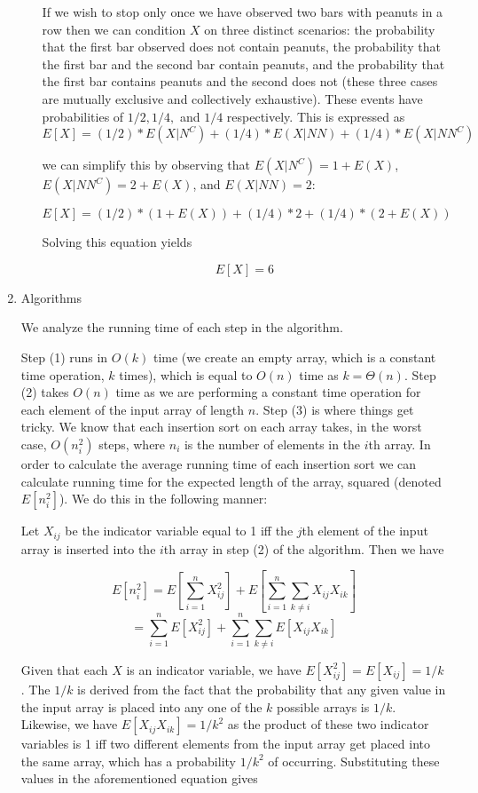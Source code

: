 \documentclass[submit]{harvardml}
\begin{document}
\begin{enumerate}
\begin{enumerate}
      If we wish to stop only once we have observed two bars with peanuts in a row then we can
      condition $X$ on three distinct scenarios: the probability that the first bar observed does
      not contain peanuts, the probability that the first bar and the second bar contain peanuts,
      and the probability that the first bar contains peanuts and the second does not (these three
      cases are mutually exclusive and collectively exhaustive). These events have probabilities of
      $1/2, 1/4, $ and $1/4$ respectively. This is expressed as
      $$E[X] = (1/2) * E(X|N^C) + (1/4) * E(X|NN) + (1/4) * E(X|NN^C)$$

      we can simplify this by observing that $E(X|N^C) = 1 + E(X)$, $E(X|NN^C) = 2 + E(X)$, and
      $E(X|NN) = 2$:

      $$E[X] = (1/2) * (1 + E(X)) + (1/4) * 2 + (1/4) * (2 + E(X))$$

      Solving this equation yields

      $$\boxed{E[X] = 6}$$
    \end{enumerate}

    \item Algorithms

    We analyze the running time of each step in the algorithm. 
    
    Step (1) runs in
    $O(k)$ time (we create an empty array, which is a constant time operation, $k$ times),
    which is equal to $O(n)$ time as $k = \Theta(n)$. Step (2) takes $O(n)$ time as we are 
    performing a constant time operation for each element of the input array of length $n$.
    Step (3) is where things get tricky. We know that each insertion sort on each array 
    takes, in the worst case, $O(n_i^2)$ steps, where $n_i$ is the number of elements in the
    $i$th array. In order to calculate the average running time of
    each insertion sort we can calculate running time for the expected length of the array, squared 
    (denoted $E[n_i^2]$). We do this in the following manner:

    Let $X_{ij}$ be the indicator variable equal to 1 iff the $j$th element of the input array
    is inserted into the $i$th array in step (2) of the algorithm. Then we have

    $$E[n_i^2] = E\left[\sum_{i=1}^n X_{ij}^2\right] + E\left[\sum_{i=1}^n \sum_{k\neq i} X_{ij} X_{ik}\right]$$
    $$ = \sum_{i=1}^n E[X_{ij}^2] + \sum_{i=1}^n \sum_{k\neq i} E[X_{ij} X_{ik}] $$

    Given that each $X$ is an indicator variable, we have $E[X_{ij}^2] = E[X_{ij}] = 1/k$. The $1/k$
    is derived from the fact that the probability that any given value in the input array is 
    placed into any one of the $k$ possible arrays is $1/k$. Likewise, we have 
    $ E[X_{ij} X_{ik}]  = 1/k^2$ as the product of these two indicator variables is 1 iff two
    different elements from the input array get placed into the same array, which has a probability
    $1/k^2$ of occurring. Substituting these values in the aforementioned equation gives


\end{enumerate}
\end{document}
